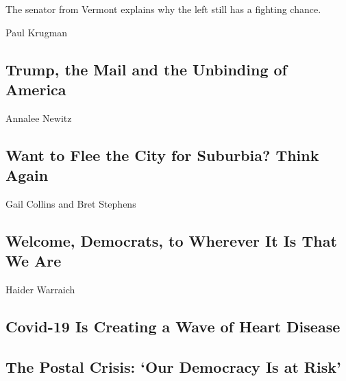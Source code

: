 The senator from Vermont explains why the left still has a fighting
chance.

\href{/2020/08/17/opinion/bernie-sanders-joe-biden.html}{}

\href{/2020/08/17/opinion/trump-us-mail.html}{}

Paul Krugman

\hypertarget{trump-the-mail-and-the-unbinding-of-america}{%
\subsection{Trump, the Mail and the Unbinding of
America}\label{trump-the-mail-and-the-unbinding-of-america}}

\href{/2020/08/17/opinion/coronavirus-cities-suburbs.html}{}

Annalee Newitz

\hypertarget{want-to-flee-the-city-for-suburbia-think-again}{%
\subsection{Want to Flee the City for Suburbia? Think
Again}\label{want-to-flee-the-city-for-suburbia-think-again}}

\href{/2020/08/17/opinion/trump-biden-harris-democratic-convention.html}{}

Gail Collins and Bret Stephens

\hypertarget{welcome-democrats-to-wherever-it-is-that-we-are}{%
\subsection{Welcome, Democrats, to Wherever It Is That We
Are}\label{welcome-democrats-to-wherever-it-is-that-we-are}}

\href{/2020/08/17/opinion/covid-19-heart-disease.html}{}

Haider Warraich

\hypertarget{covid-19-is-creating-a-wave-of-heart-disease}{%
\subsection{Covid-19 Is Creating a Wave of Heart
Disease}\label{covid-19-is-creating-a-wave-of-heart-disease}}

\href{/2020/08/17/opinion/letters/postal-service-election-democracy.html}{}

\hypertarget{the-postal-crisis-our-democracy-is-at-risk}{%
\subsection{The Postal Crisis: `Our Democracy Is at
Risk'}\label{the-postal-crisis-our-democracy-is-at-risk}}

